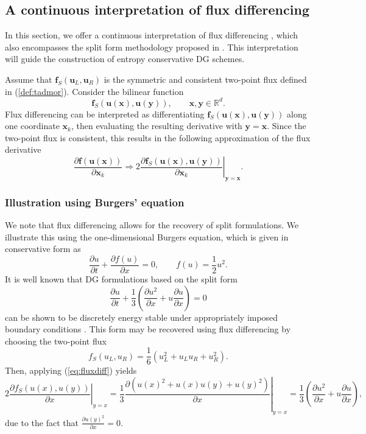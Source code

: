\documentclass[preprint,10pt]{article}
\theoremstyle{definition}
\theoremstyle{lemma}
\theoremstyle{theorem}
\newcommand{\pd}[2]{\frac{\partial#1}{\partial#2}}
\newcommand{\LRp}[1]{\left( #1 \right)}
\newcommand{\note}[1]{{\color{blue}{#1}}}
\begin{document}

\subsection{A continuous interpretation of flux differencing}

In this section, we offer a continuous interpretation of flux differencing \cite{fisher2013high,gassner2017br1,chen2017entropy}, which also encompasses the split form methodology proposed in \cite{gassner2016split}.  This interpretation will guide the construction of entropy conservative DG schemes.  

Assume that $\bm{f}_S(\bm{u}_L,\bm{u}_R)$ is the symmetric and consistent two-point flux defined in (\ref{def:tadmor}).  Consider the bilinear function
\[
\bm{f}_S\LRp{\bm{u}(\bm{x}),\bm{u}(\bm{y})}, \qquad \bm{x}, \bm{y} \in \mathbb{R}^d.  
\]
Flux differencing can be interpreted as differentiating $\bm{f}_S\LRp{\bm{u}(\bm{x}),\bm{u}(\bm{y})}$ along one coordinate $\bm{x}_k$, then evaluating the resulting derivative with $\bm{y}=\bm{x}$.  Since the two-point flux is consistent, this results in the following approximation of the flux derivative
\begin{equation}
\pd{\bm{f}(\bm{u}(\bm{x}))}{\bm{x}_k} \Longrightarrow 2\left.\pd{\bm{f}_S\LRp{\bm{u}(\bm{x}),\bm{u}(\bm{y})}}{\bm{x}_k}\right|_{\bm{y}=\bm{x}}.
\label{eq:fluxdiff}
\end{equation}

\subsubsection{Illustration using Burgers' equation}

We note that flux differencing allows for the recovery of split formulations.  We illustrate this using the one-dimensional Burgers equation, which is given in conservative form as
\[
\pd{u}{t} + \pd{f(u)}{x} = 0, \qquad f(u) = \frac{1}{2}u^2.
\]
It is well known that DG formulations based on the split form
\[
\pd{u}{t} + \frac{1}{3}\LRp{\pd{u^2}{x} + u\pd{u}{x}} = 0
\]
can be shown to be discretely energy stable under appropriately imposed boundary conditions \cite{gassner2013skew, ranocha2017extended}.  This form may be recovered using flux differencing by choosing the two-point flux
\[
f_S(u_L,u_R) = \frac{1}{6}(u_L^2 + u_Lu_R + u_R^2).
\]
Then, applying (\ref{eq:fluxdiff}) yields
\[
2\left.\pd{f_S(u(x),u(y))}{x}\right|_{y=x} = \frac{1}{3}\left.\pd{\LRp{u(x)^2 + u(x)u(y) + u(y)^2}}{x}\right|_{y=x} = \frac{1}{3}\LRp{\pd{u^2}{x} + u\pd{u}{x}},
\]
due to the fact that $\pd{u(y)^2}{x} = 0$.  
\end{document}
